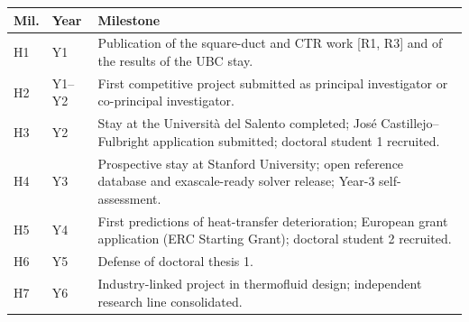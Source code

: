 \documentclass[11pt]{article}
\begin{document}
\begin{center}\small
\begin{tabularx}{\textwidth}{@{}p{1.0cm}p{1.2cm}X@{}}
\toprule
\textbf{Mil.} & \textbf{Year} & \textbf{Milestone} \\
\midrule
H1 & Y1 & Publication of the square-duct and CTR work [R1, R3] and of the results of the UBC stay. \\
H2 & Y1--Y2 & First competitive project submitted as principal investigator or co-principal investigator. \\
H3 & Y2 & Stay at the Universit\`a del Salento completed; Jos\'e Castillejo--Fulbright application submitted; doctoral student 1 recruited. \\
H4 & Y3 & Prospective stay at Stanford University; open reference database and exascale-ready solver release; Year-3 self-assessment. \\
H5 & Y4 & First predictions of heat-transfer deterioration; European grant application (ERC Starting Grant); doctoral student 2 recruited. \\
H6 & Y5 & Defense of doctoral thesis 1. \\
H7 & Y6 & Industry-linked project in thermofluid design; independent research line consolidated. \\
\bottomrule
\end{tabularx}
\end{center}
\end{document}
